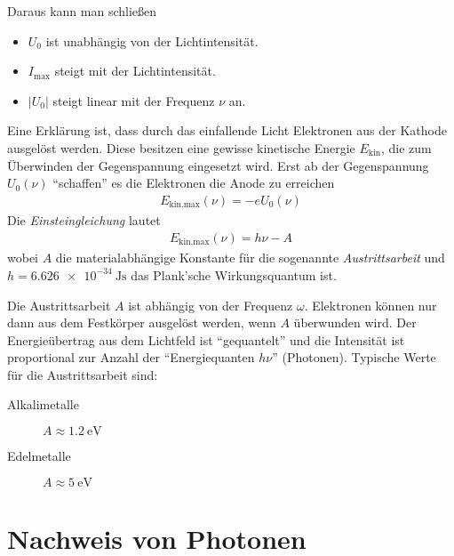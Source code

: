 Daraus kann man schließen
\begin{itemize}
\item $U_0$ ist unabhängig von der Lichtintensität.
\item $I_\text{max}$ steigt mit der Lichtintensität.
\item $|U_0|$ steigt linear mit der Frequenz $\nu$ an.
\end{itemize}
Eine Erklärung ist, dass durch das einfallende Licht Elektronen aus
der Kathode ausgelöst werden. Diese besitzen eine gewisse kinetische
Energie $E_\text{kin}$, die zum Überwinden der Gegenspannung
eingesetzt wird.
Erst ab der Gegenspannung $U_0(\nu)$ \enquote{schaffen} es die
Elektronen die Anode zu erreichen
\begin{gather*}
  E_{\text{kin,max}}(\nu) = -e U_0(\nu)
\end{gather*}
Die \emph{Einsteingleichung} lautet
\begin{gather*}
  E_{\text{kin,max}}(\nu) = h\nu - A
\end{gather*}
wobei 
$A$ 
die materialabhängige Konstante für die sogenannte \emph{Austrittsarbeit} und
$h=\SI{6.626e-34}{\joule\second}$%
das Plank'sche Wirkungsquantum ist.


Die Austrittsarbeit $A$ ist abhängig von der Frequenz $\omega$.
Elektronen können nur dann aus dem Festkörper ausgelöst werden, wenn
$A$ überwunden wird.
Der Energieübertrag aus dem Lichtfeld ist \enquote{gequantelt} und die
Intensität ist proportional zur Anzahl der \enquote{Energiequanten
  $h\nu$} (Photonen).
Typische Werte für die Austrittsarbeit sind:
\begin{description}
\item[Alkalimetalle] $A\approx \SI{1.2}{\electronvolt}$
\item[Edelmetalle] $A\approx \SI{5}{\electronvolt}$
\end{description}


\section{Nachweis von Photonen}
\cite[siehe][Kap. 5.1.4, Halbleitersensoren]{zinth}

